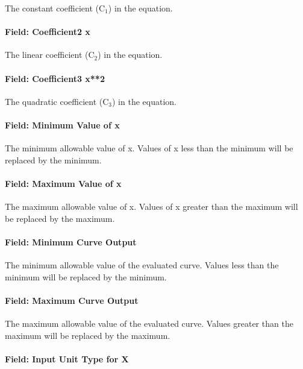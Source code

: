 The constant coefficient (C\(_{1}\)) in the equation.

\paragraph{Field: Coefficient2 x}\label{field-coefficient2-x-1}

The linear coefficient (C\(_{2}\)) in the equation.

\paragraph{Field: Coefficient3 x**2}\label{field-coefficient3-x2}

The quadratic coefficient (C\(_{3}\)) in the equation.

\paragraph{Field: Minimum Value of x}\label{field-minimum-value-of-x-2}

The minimum allowable value of x. Values of x less than the minimum will be replaced by the minimum.

\paragraph{Field: Maximum Value of x}\label{field-maximum-value-of-x-2}

The maximum allowable value of x. Values of x greater than the maximum will be replaced by the maximum.

\paragraph{Field: Minimum Curve Output}\label{field-minimum-curve-output-1}

The minimum allowable value of the evaluated curve. Values less than the minimum will be replaced by the minimum.

\paragraph{Field: Maximum Curve Output}\label{field-maximum-curve-output-1}

The maximum allowable value of the evaluated curve. Values greater than the maximum will be replaced by the maximum.

\paragraph{Field: Input Unit Type for X}\label{field-input-unit-type-for-x-2}


